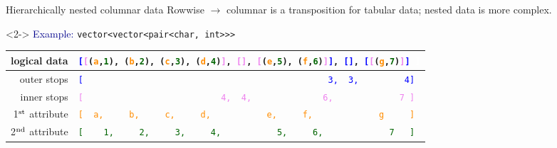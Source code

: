 \documentclass[aspectratio=169]{beamer}
\begin{document}
\begin{frame}{Hierarchically nested columnar data}
\vspace{0.25 cm}
Rowwise $\to$ columnar is a transposition for tabular data; nested data is more complex.

\begin{uncoverenv}<2->
\vspace{0.25 cm}
\textcolor{darkblue}{Example:} {\tt\small vector<vector<pair<char, int>>>}

\vspace{0.25 cm}
\begin{tabular}{r l}
\small logical data & {\tt\scriptsize \textcolor{blue}{[}\textcolor{violet}{[}(\textcolor{darkorange}{a},\textcolor{darkgreen}{1}), (\textcolor{darkorange}{b},\textcolor{darkgreen}{2}), (\textcolor{darkorange}{c},\textcolor{darkgreen}{3}), (\textcolor{darkorange}{d},\textcolor{darkgreen}{4})\textcolor{violet}{]}, \textcolor{violet}{[]}, \textcolor{violet}{[}(\textcolor{darkorange}{e},\textcolor{darkgreen}{5}), (\textcolor{darkorange}{f},\textcolor{darkgreen}{6})\textcolor{violet}{]}\textcolor{blue}{]}, \textcolor{blue}{[]}, \textcolor{blue}{[}\textcolor{violet}{[}(\textcolor{darkorange}{g},\textcolor{darkgreen}{7})\textcolor{violet}{]}\textcolor{blue}{]}\ \textcolor{white}{]}} \\\hline
\small outer stops & {\tt\scriptsize \textcolor{blue}{[\ \ \ \ \ \ \ \ \ \ \ \ \ \ \ \ \ \ \ \ \ \ \ \ \ \ \ \ \ \ \ \ \ \ \ \ \ \ \ \ \ \ \ \ \ \ \ \ 3,\ \ 3,\ \ \ \ \ \ \ \ \ 4]}} \\
\small inner stops & {\tt\scriptsize \textcolor{violet}{[\ \ \ \ \ \ \ \ \ \ \ \ \ \ \ \ \ \ \ \ \ \ \ \ \ \ \ 4,\ \ 4,\ \ \ \ \ \ \ \ \ \ \ \ \ \ 6,\ \ \ \ \ \ \ \ \ \ \ \ \ 7\ ]}} \\
\small 1$^{\mbox{\scriptsize st}}$ attribute & {\tt\scriptsize \textcolor{darkorange}{[\ \ a,\ \ \ \ \ b,\ \ \ \ \ c,\ \ \ \ \ d,\ \ \ \ \ \ \ \ \ \ \ e,\ \ \ \ \ f,\ \ \ \ \ \ \ \ \ \ \ \ \ g\ \ \ \ \ ]}} \\
\small 2$^{\mbox{\scriptsize nd}}$ attribute & {\tt\scriptsize \textcolor{darkgreen}{[\ \ \ \ 1,\ \ \ \ \ 2,\ \ \ \ \ 3,\ \ \ \ \ 4,\ \ \ \ \ \ \ \ \ \ \ 5,\ \ \ \ \ 6,\ \ \ \ \ \ \ \ \ \ \ \ \ 7\ \ \ ]}}
\end{tabular}

\end{uncoverenv}
\end{frame}
\end{document}

